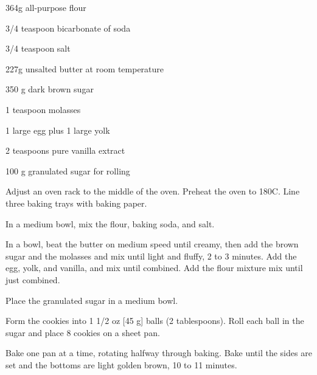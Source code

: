 \label{recipe:brown_sugar_cookies}


\begin{ingredients}

  \item 364g all-purpose flour
  \item 3/4 teaspoon bicarbonate of soda
  \item 3/4 teaspoon salt
  \item 227g unsalted butter at room temperature
  \item 350 g dark brown sugar
  \item 1 teaspoon molasses
  \item 1 large egg plus 1 large yolk
  \item 2 teaspoons pure vanilla extract
  \item 100 g granulated sugar for rolling
\end{ingredients}


\begin{method}
  	Adjust an oven rack to the middle of the oven. Preheat the oven to
180C. Line three baking trays with baking paper.

In a medium bowl, mix the flour, baking soda, and salt.

In a bowl, beat the butter on medium speed until creamy, then add
the brown sugar and the molasses and mix until light and fluffy, 2 to
3 minutes. Add the egg, yolk, and vanilla, and mix until combined.
Add the flour mixture mix until just combined.

Place the granulated sugar in a medium bowl.

Form the cookies into 1 1/2 oz [45 g] balls (2 tablespoons). Roll
each ball in the sugar and place 8 cookies on a sheet pan.

Bake one pan at a time, rotating halfway through baking. Bake until
the sides are set and the bottoms are light golden brown, 10 to 11
minutes.
  
\end{method}


